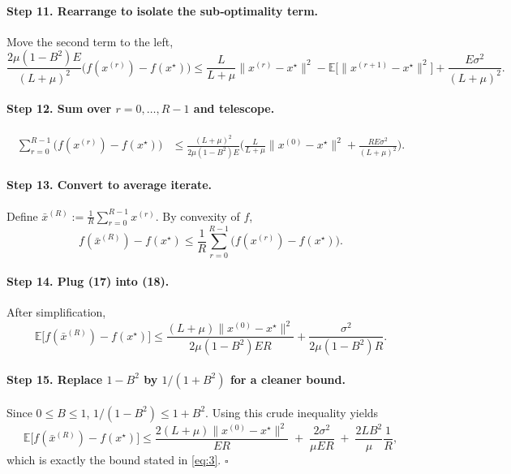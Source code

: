 \documentclass{article}
\newcommand{\E}{\mathbb{E}}
\begin{document}
\paragraph{Step 11. Rearrange to isolate the sub‑optimality term.}  
Move the second term to the left,
\[
\frac{2\mu(1-B^2)E}{(L+\mu)^2}\big(f(x^{(r)})-f(x^\star)\big)
\le \frac{L}{L+\mu}\|x^{(r)}-x^\star\|^2
-\E\big[\|x^{(r+1)}-x^\star\|^2\big]
+\frac{E\sigma^2}{(L+\mu)^2}.
\tag{16}
\]

\paragraph{Step 12. Sum over $r=0,\dots,R-1$ and telescope.}  
\[
\begin{aligned}
\sum_{r=0}^{R-1}\big(f(x^{(r)})-f(x^\star)\big)
&\le \frac{(L+\mu)^2}{2\mu(1-B^2)E}
\Bigg(
\frac{L}{L+\mu}\|x^{(0)}-x^\star\|^2
+\frac{RE\sigma^2}{(L+\mu)^2}
\Bigg) .
\end{aligned}
\tag{17}
\]

\paragraph{Step 13. Convert to average iterate.}  
Define $\bar{x}^{(R)}:=\frac1R\sum_{r=0}^{R-1}x^{(r)}$. By convexity of $f$,
\[
f(\bar{x}^{(R)})-f(x^\star)\le \frac1R\sum_{r=0}^{R-1}\big(f(x^{(r)})-f(x^\star)\big).
\tag{18}
\]

\paragraph{Step 14. Plug (17) into (18).}  
After simplification,
\[
\E\big[f(\bar{x}^{(R)})-f(x^\star)\big]
\le
\frac{(L+\mu)\|x^{(0)}-x^\star\|^2}{2\mu(1-B^2)ER}
+\frac{\sigma^2}{2\mu(1-B^2)R}.
\tag{19}
\]

\paragraph{Step 15. Replace $1-B^2$ by $1/(1+ B^2)$ for a cleaner bound.}  
Since $0\le B\le 1$, $1/(1-B^2)\le 1+ B^2$. Using this crude inequality yields
\[
\E\big[f(\bar{x}^{(R)})-f(x^\star)\big]
\le
\frac{2(L+\mu)\|x^{(0)}-x^\star\|^2}{ER}
\;+\;
\frac{2\sigma^2}{\mu ER}
\;+\;
\frac{2L B^2}{\mu}\frac{1}{R},
\]
which is exactly the bound stated in \eqref{eq:3}. \hfill $\square$
\end{document}
